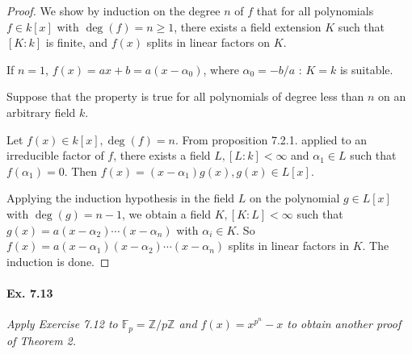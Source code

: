 \documentclass[11pt,a4paper]{article}
\newcommand{\Z}{\mathbb{Z}}
\newcommand{\F}{\mathbb{F}}
\begin{document}
\begin{proof}
We show by induction on the degree $n$ of $f$ that for all polynomials $f \in k[x]$ with $\deg(f) = n \geq 1$, there exists a field extension $K$ such that $[K:k]$ is finite, and $f(x)$ splits in linear factors on $K$.

If $n = 1$, $f(x) = ax+b = a(x-\alpha_0)$, where $\alpha_0 = -b/a$ : $K = k$ is suitable.

Suppose that the property is true for all polynomials of degree less than $n$ on an arbitrary field $k$.

Let $f(x) \in k[x], \deg(f) = n$. From proposition 7.2.1. applied to an irreducible factor of $f$, there exists a field $L, [L:k]<\infty$ and $\alpha_1 \in L$ such that $f(\alpha_1) = 0$. Then $f(x) = (x-\alpha_1) g(x), g(x) \in L[x]$. 

Applying the induction hypothesis in the field $L$ on the polynomial $g \in L[x]$ with $\deg(g) = n-1$, we obtain a field $K, [K:L]<\infty$ such that $g(x) = a(x-\alpha_2)\cdots(x-\alpha_n)$ with $\alpha_i \in K$. So  $f(x) = a(x-\alpha_1)(x-\alpha_2)\cdots(x-\alpha_n)$ splits in linear factors in $K$. The induction is done.
\end{proof}

\paragraph{Ex. 7.13}

{\it Apply Exercise 7.12 to $\F_p = \Z/p\Z$ and $f(x) = x^{p^n} -x$ to obtain another proof of Theorem 2.
}
\end{document}
